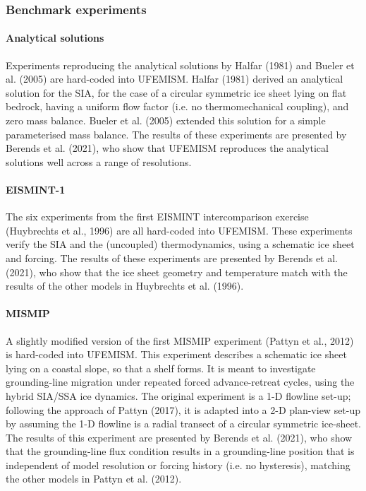 \documentclass{article}
\begin{document}
\subsubsection{Benchmark experiments}

\paragraph{Analytical solutions}

Experiments reproducing the analytical solutions by Halfar (1981) and Bueler et al. (2005) are hard-coded into UFEMISM. Halfar (1981) derived an analytical solution for the SIA, for the case of a circular symmetric ice sheet lying on flat bedrock, having a uniform flow factor (i.e. no thermomechanical coupling), and zero mass balance. Bueler et al. (2005) extended this solution for a simple parameterised mass balance. The results of these experiments are presented by Berends et al. (2021), who show that UFEMISM reproduces the analytical solutions well across a range of resolutions.

\paragraph{EISMINT-1}

The six experiments from the first EISMINT intercomparison exercise (Huybrechts et al., 1996) are all hard-coded into UFEMISM. These experiments verify the SIA and the (uncoupled) thermodynamics, using a schematic ice sheet and forcing. The results of these experiments are presented by Berends et al. (2021), who show that the ice sheet geometry and temperature match with the results of the other models in Huybrechts et al. (1996).

\paragraph{MISMIP}

A slightly modified version of the first MISMIP experiment (Pattyn et al., 2012) is hard-coded into UFEMISM. This experiment describes a schematic ice sheet lying on a coastal slope, so that a shelf forms. It is meant to investigate grounding-line migration under repeated forced advance-retreat cycles, using the hybrid SIA/SSA ice dynamics. The original experiment is a 1-D flowline set-up; following the approach of Pattyn (2017), it is adapted into a 2-D plan-view set-up by assuming the 1-D flowline is a radial transect of a circular symmetric ice-sheet. The results of this experiment are presented by Berends et al. (2021), who show that the grounding-line flux condition results in a grounding-line position that is independent of model resolution or forcing history (i.e. no hysteresis), matching the other models in Pattyn et al. (2012).
\end{document}
